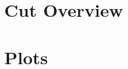 \documentclass{article}
\begin{document}
\section[Cut Overview]{Cut Overview}

\centering


\section[Plots]{Plots}

\centering
\end{document}
